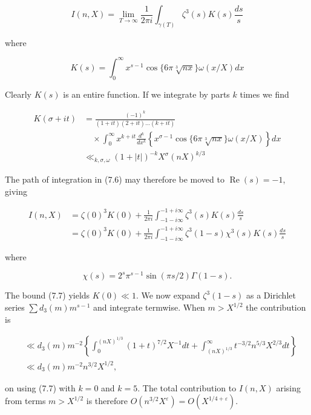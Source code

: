 \documentclass[10pt]{article}
\begin{document}
\begin{equation*}
I(n, X)=\lim _{T \rightarrow \infty} \frac{1}{2 \pi i} \int_{\gamma(T)} \zeta^{3}(s) K(s) \frac{d s}{s} \tag{7.6}
\end{equation*}


where

$$
K(s)=\int_{0}^{\infty} x^{s-1} \cos \{6 \pi \sqrt[3]{n x}\} \omega(x / X) d x
$$

Clearly $K(s)$ is an entire function. If we integrate by parts $k$ times we find


\begin{align*}
K(\sigma+i t) & =\frac{(-1)^{k}}{(1+i t)(2+i t) \ldots(k+i t)}  \tag{7.7}\\
& \quad \times \int_{0}^{\infty} x^{k+i t} \frac{d^{k}}{d x^{k}}\left\{x^{\sigma-1} \cos \{6 \pi \sqrt[3]{n x}\} \omega(x / X)\right\} d x \\
& \ll_{k, \sigma, \omega}(1+|t|)^{-k} X^{\sigma}(n X)^{k / 3}
\end{align*}


The path of integration in (7.6) may therefore be moved to $\operatorname{Re}(s)=-1$, giving

$$
\begin{aligned}
I(n, X) & =\zeta(0)^{3} K(0)+\frac{1}{2 \pi i} \int_{-1-i \infty}^{-1+i \infty} \zeta^{3}(s) K(s) \frac{d s}{s} \\
& =\zeta(0)^{3} K(0)+\frac{1}{2 \pi i} \int_{-1-i \infty}^{-1+i \infty} \zeta^{3}(1-s) \chi^{3}(s) K(s) \frac{d s}{s}
\end{aligned}
$$

where

$$
\chi(s)=2^{s} \pi^{s-1} \sin (\pi s / 2) \Gamma(1-s) .
$$

The bound (7.7) yields $K(0) \ll 1$. We now expand $\zeta^{3}(1-s)$ as a Dirichlet series $\sum d_{3}(m) m^{s-1}$ and integrate termwise. When $m>X^{1 / 2}$ the contribution is

$$
\begin{aligned}
& \ll d_{3}(m) m^{-2}\left\{\int_{0}^{(n X)^{1 / 3}}(1+t)^{7 / 2} X^{-1} d t+\int_{(n X)^{1 / 3}}^{\infty} t^{-3 / 2} n^{5 / 3} X^{2 / 3} d t\right\} \\
& \ll d_{3}(m) m^{-2} n^{3 / 2} X^{1 / 2},
\end{aligned}
$$

on using (7.7) with $k=0$ and $k=5$. The total contribution to $I(n, X)$ arising from terms $m>X^{1 / 2}$ is therefore $O\left(n^{3 / 2} X^{\varepsilon}\right)=O\left(X^{1 / 4+\varepsilon}\right)$.
\end{document}
